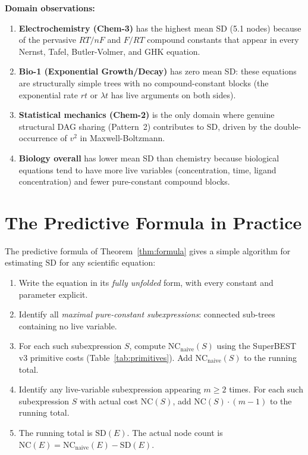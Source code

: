 \documentclass[12pt,a4paper]{article}
\theoremstyle{definition}
\newcommand{\NC}{\mathrm{NC}}
\newcommand{\SD}{\mathrm{SD}}
\begin{document}
\medskip
\noindent\textbf{Domain observations:}
\begin{enumerate}[noitemsep]
  \item \textbf{Electrochemistry (Chem-3)} has the highest mean SD (5.1 nodes)
        because of the pervasive $RT/nF$ and $F/RT$ compound constants that
        appear in every Nernst, Tafel, Butler-Volmer, and GHK equation.
  \item \textbf{Bio-1 (Exponential Growth/Decay)} has zero mean SD: these
        equations are structurally simple trees with no compound-constant
        blocks (the exponential rate $rt$ or $\lambda t$ has live arguments
        on both sides).
  \item \textbf{Statistical mechanics (Chem-2)} is the only domain where
        genuine structural DAG sharing (Pattern~2) contributes to $\SD$,
        driven by the double-occurrence of $v^2$ in Maxwell-Boltzmann.
  \item \textbf{Biology overall} has lower mean SD than chemistry because
        biological equations tend to have more live variables (concentration,
        time, ligand concentration) and fewer pure-constant compound blocks.
\end{enumerate}

\section{The Predictive Formula in Practice}
\label{sec:practice}

The predictive formula of Theorem~\ref{thm:formula} gives a simple algorithm
for estimating $\SD$ for any scientific equation:

\begin{enumerate}
  \item Write the equation in its \emph{fully unfolded} form, with every
        constant and parameter explicit.
  \item Identify all \emph{maximal pure-constant subexpressions}: connected
        sub-trees containing no live variable.
  \item For each such subexpression $S$, compute $\NC_{\mathrm{naive}}(S)$
        using the SuperBEST v3 primitive costs (Table~\ref{tab:primitives}).
        Add $\NC_{\mathrm{naive}}(S)$ to the running total.
  \item Identify any live-variable subexpression appearing $m \geq 2$ times.
        For each such subexpression $S$ with actual cost $\NC(S)$, add
        $\NC(S) \cdot (m-1)$ to the running total.
  \item The running total is $\SD(E)$.  The actual node count is
        $\NC(E) = \NC_{\mathrm{naive}}(E) - \SD(E)$.
\end{enumerate}
\end{document}
